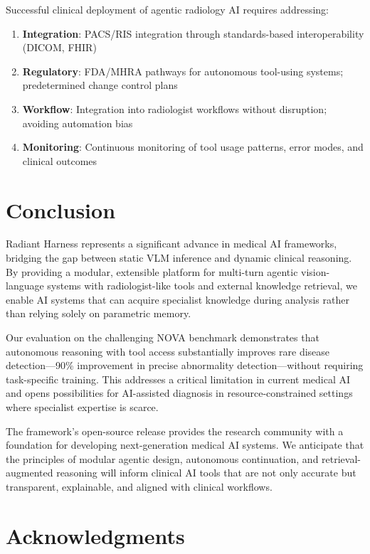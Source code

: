 \documentclass[11pt]{article}
\begin{document}
Successful clinical deployment of agentic radiology AI requires addressing:

\begin{enumerate}
    \item \textbf{Integration}: PACS/RIS integration through standards-based interoperability (DICOM, FHIR)
    \item \textbf{Regulatory}: FDA/MHRA pathways for autonomous tool-using systems; predetermined change control plans \citep{fdaguidance}
    \item \textbf{Workflow}: Integration into radiologist workflows without disruption; avoiding automation bias \citep{glaser2021global}
    \item \textbf{Monitoring}: Continuous monitoring of tool usage patterns, error modes, and clinical outcomes
\end{enumerate}

\section{Conclusion}
\label{sec:conclusion}

Radiant Harness represents a significant advance in medical AI frameworks, bridging the gap between static VLM inference and dynamic clinical reasoning. By providing a modular, extensible platform for multi-turn agentic vision-language systems with radiologist-like tools and external knowledge retrieval, we enable AI systems that can acquire specialist knowledge during analysis rather than relying solely on parametric memory.

Our evaluation on the challenging NOVA benchmark demonstrates that autonomous reasoning with tool access substantially improves rare disease detection---90\% improvement in precise abnormality detection---without requiring task-specific training. This addresses a critical limitation in current medical AI and opens possibilities for AI-assisted diagnosis in resource-constrained settings where specialist expertise is scarce.

The framework's open-source release provides the research community with a foundation for developing next-generation medical AI systems. We anticipate that the principles of modular agentic design, autonomous continuation, and retrieval-augmented reasoning will inform clinical AI tools that are not only accurate but transparent, explainable, and aligned with clinical workflows.

\section*{Acknowledgments}
\end{document}

